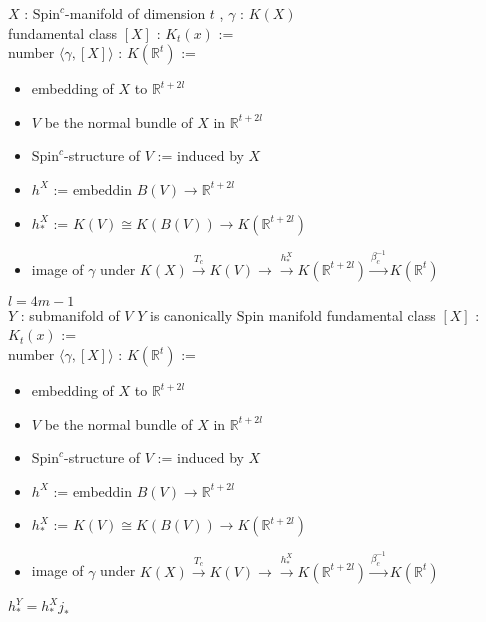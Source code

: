 \begin{Definition}[\(K\) version]
\itemwhen
  \Fix \(X\) : \(\text{Spin}^c\)-manifold of dimension \(t\) , \(\gamma\) : \(K(X)\) \\
\itemdefi
  \Define fundamental class \([X]\) : \(K_t(x)\) := \WIP \\
  \Define number \(\langle \gamma , [X] \rangle\) : \(K(\mathbb{R}^t)\) :=
  \begin{itemize}
    \item[] \Take embedding of \(X\) to \(\mathbb{R}^{t+2l}\) 
    \item[] \Let \(V\) be the normal bundle of \(X\) in \(\mathbb{R}^{t+2l}\)
    \item[] \Let \(\text{Spin}^c\)-structure of \(V\) := induced by \(X\)
    \item[] \Let \(h^X\) := embeddin \(B(V) \to \mathbb{R}^{t+2l}\) 
    \item[] \Let \(h^X_*\) := \(K(V) \cong K(B(V)) \to K(\mathbb{R}^{t+2l})\) 
    \item[] \Return image of \(\gamma\) under \(K(X) \overset{T_c}{\to} K(V) \to \overset{h^X_*}{\to} K(\mathbb{R}^{t+2l}) \overset{\beta_c^{-1}}{\to} K(\mathbb{R}^t)\)
  \end{itemize}
\end{Definition}

\begin{Definition}
\itemwhen
  \IfHold \(l = 4m-1\) \\
  \Fix \(Y\) : submanifold of \(V\)
\itemprop
  \Then \(Y\) is canonically \(\text{Spin}\) manifold
\itemdefi
\Define fundamental class \([X]\) : \(K_t(x)\) := \WIP \\
\Define number \(\langle \gamma , [X] \rangle\) : \(K(\mathbb{R}^t)\) :=
  \begin{itemize}
    \item[] \Take embedding of \(X\) to \(\mathbb{R}^{t+2l}\) 
    \item[] \Let \(V\) be the normal bundle of \(X\) in \(\mathbb{R}^{t+2l}\)
    \item[] \Let \(\text{Spin}^c\)-structure of \(V\) := induced by \(X\)
    \item[] \Let \(h^X\) := embeddin \(B(V) \to \mathbb{R}^{t+2l}\) 
    \item[] \Let \(h^X_*\) := \(K(V) \cong K(B(V)) \to K(\mathbb{R}^{t+2l})\) 
    \item[] \Return image of \(\gamma\) under \(K(X) \overset{T_c}{\to} K(V) \to \overset{h^X_*}{\to} K(\mathbb{R}^{t+2l}) \overset{\beta_c^{-1}}{\to} K(\mathbb{R}^t)\)
  \end{itemize}
\itemprop
  \Then \(h^Y_* = h^X_* j_*\)
\end{Definition}

